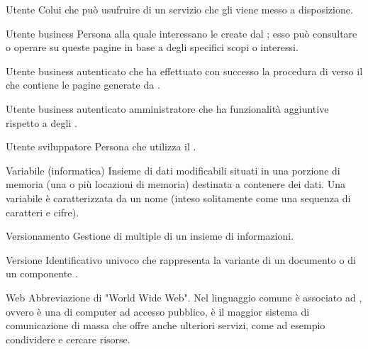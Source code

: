 \elemento
{Utente}
{Colui che può usufruire di un servizio che gli viene messo a disposizione.}

\elemento
{Utente business}
{Persona alla quale interessano le  create dal  ; esso può consultare o operare su queste pagine in base a degli specifici scopi o interessi.}

\elemento
{Utente business autenticato}
{ che ha effettuato con successo la procedura di  verso il  che contiene le pagine generate da .}

\elemento
{Utente business autenticato amministratore}
{ che ha funzionalità aggiuntive rispetto a degli .}

\gloss
{Utente sviluppatore}
{Persona che utilizza il  .}


\elemento
{Variabile (informatica)}
{Insieme di dati modificabili situati in una porzione di memoria (una o più locazioni di memoria) destinata a contenere dei dati. Una variabile è caratterizzata da un nome (inteso solitamente come una sequenza di caratteri e cifre).}

\elemento
{Versionamento}
{Gestione di  multiple di un insieme di informazioni.}

\elemento
{Versione}
{Identificativo univoco che rappresenta la variante di un documento o di un componente .}



\elemento
{Web}
{Abbreviazione di "World Wide Web". Nel linguaggio comune è associato ad , ovvero è una   di computer ad accesso pubblico, è il maggior sistema di comunicazione di massa che offre anche ulteriori servizi, come ad esempio condividere e cercare risorse.}
